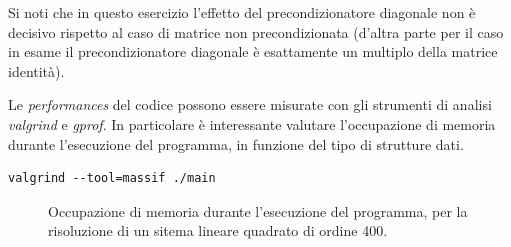 Si noti che in questo esercizio l'effetto del precondizionatore diagonale non \`e decisivo
rispetto al caso di matrice non precondizionata (d'altra parte per il
caso in esame il precondizionatore diagonale \`e esattamente un
multiplo della matrice identit\`a).

Le \emph{performances} del codice possono essere
misurate con gli strumenti di analisi \emph{valgrind} e
\emph{gprof}. In particolare \`e interessante valutare l'occupazione di
memoria durante l'esecuzione del programma, in funzione del tipo di
strutture dati.
\begin{verbatim}
valgrind --tool=massif ./main
\end{verbatim}

\begin{figure}
\caption{Occupazione di memoria durante l'esecuzione del programma,
  per la risoluzione di un sitema lineare quadrato di ordine 400.}
\label{fig:fin:results}
\end{figure}


